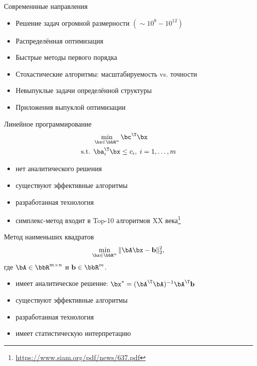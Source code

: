 \documentclass[12pt]{beamer}
\begin{document}
\begin{frame}{Современнные направления}
\begin{itemize}
\item Решение задач огромной размерности $(\sim 10^8-10^{12})$
\item Распределённая оптимизация
\item Быстрые методы первого порядка
\item Стохастические алгоритмы: масштабируемость vs. точности
\item Невыпуклые задачи определённой структуры
\item Приложения выпуклой оптимизации
\end{itemize}
\end{frame}

\begin{frame}{Линейное программирование}
\begin{equation*}
\begin{split}
&\min\limits_{\bx \in \bbR^n} \bc^{\T}\bx\\
\text{s.t. } & \ba^{\T}_i \bx \leq c_i, \; i = 1,\ldots, m
\end{split}
\label{eq::lin_prog}
\end{equation*}
\begin{itemize}
\item нет аналитического решения
\item существуют эффективные алгоритмы
\item разработанная технология
\item симплекс-метод входит в Top-10 алгоритмов XX века\footnote{\url{https://www.siam.org/pdf/news/637.pdf}}
\end{itemize}
\end{frame}

\begin{frame}{Метод наименьших квадратов}
\begin{equation*}
\min\limits_{\bx \in \bbR^n} \|\bA\bx - \mathbf{b} \|^2_2,
\label{eq::least_sq}
\end{equation*}
где $\bA \in \bbR^{m \times n}$ и $\mathbf{b} \in \bbR^m$.
\begin{itemize}
\item имеет аналитическое решение: $\bx^* = (\bA^{\T}\bA)^{-1}\bA^{\T}\mathbf{b}$
\item существуют эффективные алгоритмы
\item разработанная технология
\item имеет статистическую интерпретацию
\end{itemize}
\end{frame}
\end{document}
